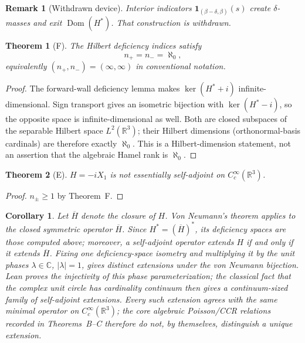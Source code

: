 ﻿\documentclass[11pt]{article}
\newtheorem{theorem}{Theorem}
\newtheorem{corollary}{Corollary}
\newtheorem{remark}{Remark}
\begin{document}
\begin{remark}[Withdrawn device]
Interior indicators \(\mathbf{1}_{(\beta-\delta,\beta)}(s)\) create \(\delta\)-masses and exit \(\operatorname{Dom}(H^*)\). That construction is withdrawn.
\end{remark}

\begin{theorem}[F]
The Hilbert deficiency indices satisfy
\[
n_+=n_-=\aleph_0,
\]
equivalently \((n_+,n_-)=(\infty,\infty)\) in conventional notation.
\end{theorem}
\begin{proof}
The forward-wall deficiency lemma makes \(\ker(H^*+i)\)
infinite-dimensional. Sign transport gives an isometric bijection with
\(\ker(H^*-i)\), so the opposite space is infinite-dimensional as well.
Both are closed subspaces of the separable Hilbert space
\(L^2(\mathbb{R}^3)\); their Hilbert dimensions (orthonormal-basis cardinals)
are therefore exactly \(\aleph_0\). This is a Hilbert-dimension statement, not
an assertion that the algebraic Hamel rank is \(\aleph_0\).
\end{proof}

\begin{theorem}[E]
\(H=-iX_1\) is not essentially self-adjoint on \(C_c^\infty(\mathbb{R}^3)\).
\end{theorem}
\begin{proof}
\(n_\pm\ge 1\) by Theorem~F.
\end{proof}

\begin{corollary}
Let \(\overline H\) denote the closure of \(H\). Von Neumann's theorem applies
to the closed symmetric operator \(\overline H\). Since
\(H^*=(\overline H)^*\), its deficiency spaces are those computed above;
moreover, a self-adjoint operator extends \(H\) if and only if it extends
\(\overline H\). Fixing one deficiency-space isometry and multiplying it by
the unit phases \(\lambda\in\mathbb C\), \(|\lambda|=1\), gives distinct
extensions under the von Neumann bijection. Lean proves the injectivity of
this phase parameterization; the classical fact that the complex unit circle
has cardinality continuum then gives a continuum-sized family of
self-adjoint extensions. Every
such extension agrees with the same minimal operator on
\(C_c^\infty(\mathbb{R}^3)\); the core algebraic Poisson/CCR relations
recorded in Theorems~B--C therefore do not, by themselves, distinguish a
unique extension.
\end{corollary}
\end{document}
